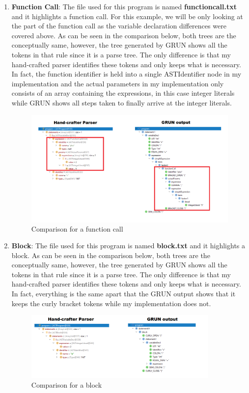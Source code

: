 \documentclass{article}
\begin{document}
\begin{enumerate}
\item \textbf{Function Call}: The file used for this program is named \textbf{functioncall.txt} and it highlights a function call. For this example, we will be only looking at the part of the function call as the variable declaration differences were covered above. As can be seen in the comparison below, both trees are the conceptually same, however, the tree generated by GRUN shows all the tokens in that rule since it is a parse tree. The only difference is that my hand-crafted parser identifies these tokens and only keeps what is necessary.  In fact, the function identifier is held into a single ASTIdentifier node in my implementation and the actual parameters in my implementation only consists of an array containing the expressions, in this case integer literals while GRUN shows all steps taken to finally arrive at the integer literals.
						\begin{figure}[H]
					\centering
			 			\includegraphics[width=\textwidth]{comparefunctioncall.png}
			  			\caption{Comparison for a function call}
			  			\label{fig:comparefunctioncall}
					\end{figure}

\item \textbf{Block}: The file used for this program is named \textbf{block.txt} and it highlights a block. As can be seen in the comparison below, both trees are the conceptually same, however, the tree generated by GRUN shows all the tokens in that rule since it is a parse tree. The only difference is that my hand-crafted parser identifies these tokens and only keeps what is necessary.  In fact, everything is the same apart that the GRUN output shows that it keeps the curly bracket tokens while my implementation does not.
						\begin{figure}[H]
					\centering
			 			\includegraphics[width=0.9\textwidth]{compareblock.png}
			  			\caption{Comparison for a block}
			  			\label{fig:compareblock}
					\end{figure}
					

\end{enumerate}
\end{document}
